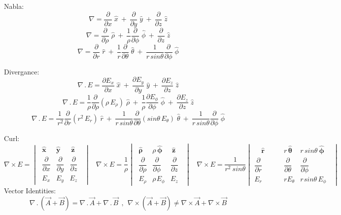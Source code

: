 \par
Nabla:
$$ \nabla = \frac{\partial}{\partial x}\;\hat{x} ~+~ \frac{\partial}{\partial y}\;\hat{y} ~+~ \frac{\partial}{\partial z}\;\hat{z} $$
$$ \nabla = \frac{\partial}{\partial \rho}\;\hat{\rho} ~+~ \frac{1}{\rho}\frac{\partial}{\partial \phi}\;\hat{\phi} ~+~ \frac{\partial}{\partial z}\;\hat{z} $$
$$ \nabla = \frac{\partial}{\partial r}\;\hat{r} ~+~ \frac{1}{r}\frac{\partial}{\partial \theta}\;\hat{\theta} ~+~ \frac{1}{r\,sin\theta}\frac{\partial}{\partial \phi}\;\hat{\phi} $$
\par
Divergance:
$$ \nabla\,.\,E = \frac{\partial E_x}{\partial x}\;\hat{x} ~+~ \frac{\partial E_y}{\partial y}\;\hat{y} ~+~ \frac{\partial E_z}{\partial z}\;\hat{z} $$
$$ \nabla\,.\,E = \frac{1}{\rho} \frac{\partial}{\partial \rho} (\rho \,E_{\rho})\;\hat{\rho} ~+~ \frac{1}{\rho}\frac{\partial E_{\phi}}{\partial \phi}\;\hat{\phi} ~+~ \frac{\partial E_{z}}{\partial z}\;\hat{z} $$
$$ \nabla\,.\,E = \frac {1}{\,r^2}\frac{\partial}{\partial r} (r^2 \, E_r)\;\hat{r} ~+~ \frac{1}{r\,sin\theta}\frac{\partial}{\partial \theta}(sin\theta\, E_{\theta})\;\hat{\theta} ~+~ \frac{1}{r\,sin\theta}\frac{\partial}{\partial \phi}\;\hat{\phi} $$
\par
Curl:
$$ \nabla \times E =  \begin{vmatrix}
\;\hat{\boldsymbol{x}} & \hat{\boldsymbol{y}} & ~\hat{\boldsymbol{z}}\;\;\\[0.25em]
\;\dfrac{\partial}{\partial x} & \dfrac{\partial}{\partial y} & \dfrac{\partial}{\partial z}\;\;\\[0.8em]
\;E_x & E_y & E_z\;\;
\end{vmatrix} ~~~~
 \nabla \times E = \frac{1}{\rho} \begin{vmatrix}
\;\hat{\boldsymbol{\rho}} & \rho\,\hat{\boldsymbol{\phi}} & ~\hat{\boldsymbol{z}}\;\;\\[0.25em]
\;\dfrac{\partial}{\partial \rho} & \dfrac{\partial}{\partial \phi} & \dfrac{\partial}{\partial z}\;\;\\[0.8em]
\;E_{\rho} & \rho\hspace{1pt}E_{\phi} & E_z\;\;
\end{vmatrix} ~~~~
 \nabla \times E = \frac{1}{r^2~ sin \theta} \begin{vmatrix}
\quad\hat{\boldsymbol{r}}\quad\quad & r \, \hat{\boldsymbol{\theta}} & r\, sin \theta \:\hat{\boldsymbol{\phi}}\;\;\\[0.25em]
\dfrac{\partial}{\partial r} & \dfrac{\partial}{\partial \theta} & \dfrac{\partial}{\partial \phi}\;\;\\[0.8em]
E_{r} & r E_{\theta} & r \hspace{1pt} sin \theta \, E_{\phi}\;\;
\end{vmatrix}$$
Vector Identities:
$$ \nabla \,.\, ( \vec{A} +  \vec{B} ) = \nabla \,.\, \vec{A} +  \nabla \,.\,  \vec{B}  ~~ , ~~\nabla \times ( \vec{A} +  \vec{B} ) \neq \nabla \times \vec{A} +  \nabla \times  \vec{B} $$
~\par
